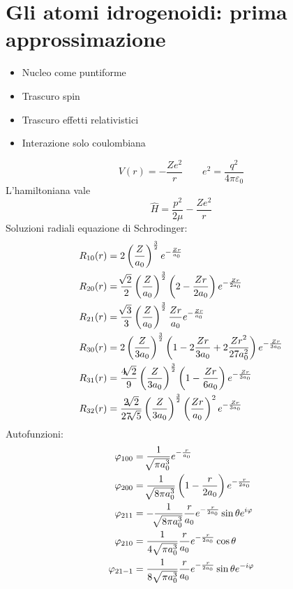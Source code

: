 \chapter{Gli atomi idrogenoidi: prima approssimazione}

\begin{itemize}
    \item Nucleo come puntiforme
    \item Trascuro spin
    \item Trascuro effetti relativistici
    \item Interazione solo coulombiana
\end{itemize}
\begin{equation*}
    V(r) = - \frac{Ze^2}{r} \qquad e^2 = \frac{q^2}{4\pi \varepsilon_0}
\end{equation*}
L'hamiltoniana vale
\begin{equation*}
    \hat{H} = \frac{p^2}{2\mu} - \frac{Ze^2}{r}
\end{equation*}
Soluzioni radiali equazione di Schrodinger:
\begin{align*}
    R_{10}(r) &= 2 \left(\frac{Z}{a_0}\right)^\frac{3}{2} e^{-\frac{Z r}{a_0}} \\
    R_{20}(r) &= \frac{\sqrt[]{2}}{2} \left(\frac{Z}{a_0}\right)^\frac{3}{2} \left(2-\frac{Zr}{2a_0}\right) e^{-\frac{Z r}{2a_0}} \\
     R_{21}(r) &= \frac{\sqrt[]{3}}{3} \left(\frac{Z}{a_0}\right)^\frac{3}{2} \frac{Zr}{a_0} e^{-\frac{Z r}{a_0}} \\
    R_{30}(r) &= 2 \left(\frac{Z}{3a_0}\right)^\frac{3}{2} \left(1 - 2 \frac{Zr}{3a_0} + 2 \frac{{Zr}^2}{27a_0^2}\right) e^{-\frac{Z r}{3a_0}} \\
     R_{31}(r) &= \frac{4\sqrt[]{2}}{9} \left(\frac{Z}{3a_0}\right)^\frac{3}{2} \left(1-\frac{Zr}{6a_0}\right) e^{-\frac{Z r}{3a_0}} \\
     R_{32}(r) &= \frac{2\sqrt[]{2}}{27\sqrt[]{5}} \left(\frac{Z}{3a_0}\right)^\frac{3}{2} \left(\frac{Zr}{a_0}\right)^2 e^{-\frac{Z r}{3a_0}}
\end{align*}
Autofunzioni:
\begin{align*}
    \varphi_{100} &= \frac{1}{\sqrt[]{\pi a_0^3}} e^{-\frac{r}{a_0}} \\
    \varphi_{200} &= \frac{1}{\sqrt[]{8\pi a_0^3}} \left(1-\frac{r}{2a_0}\right) e^{-\frac{r}{2a_0}} \\
    \varphi_{211} &= -\frac{1}{\sqrt[]{8\pi a_0^3}} \frac{r}{a_0} e^{-\frac{r}{2a_0}} \sin\theta e^{i\varphi} \\
    \varphi_{210} &= \frac{1}{4\; \sqrt[]{\pi a_0^3}} \frac{r}{a_0} e^{-\frac{r}{2a_0}} \cos\theta \\
    \varphi_{21-1} &= \frac{1}{8\; \sqrt[]{\pi a_0^3}} \frac{r}{a_0} e^{-\frac{r}{2a_0}} \sin\theta e^{-i\varphi} 
\end{align*}
